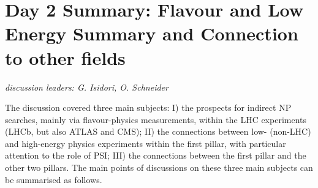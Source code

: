\section*{Day 2 Summary: Flavour and Low Energy Summary and Connection to other 
fields}\label{discussionconnetion}{\it discussion leaders: G. Isidori, O. Schneider}

\noindent The discussion covered three main subjects: I) the prospects for indirect NP searches, mainly via flavour-physics 
measurements, within the LHC experiments (LHCb, but also ATLAS and CMS);
II) the connections between low- (non-LHC) and high-energy physics experiments within the first pillar, with particular attention to the role of PSI;
III) the connections between the first pillar and the other two pillars.
The main points of discussions on these three main subjects can be summarised as follows.

